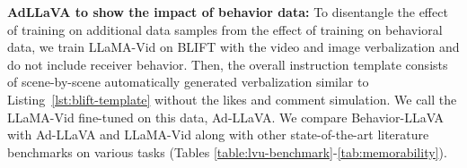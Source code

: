 \textbf{AdLLaVA to show the impact of behavior data:} To disentangle the effect of training on additional data samples from the effect of training on behavioral data, we train LLaMA-Vid on BLIFT with the video and image verbalization and do not include receiver behavior. Then, the overall instruction template consists of scene-by-scene automatically generated verbalization similar to Listing~\ref{lst:blift-template} without the likes and comment simulation. We call the LLaMA-Vid fine-tuned on this data, Ad-LLaVA. We compare Behavior-LLaVA with Ad-LLaVA and LLaMA-Vid along with other state-of-the-art literature benchmarks on various tasks (Tables \ref{table:lvu-benchmark}-\ref{tab:memorability}).





